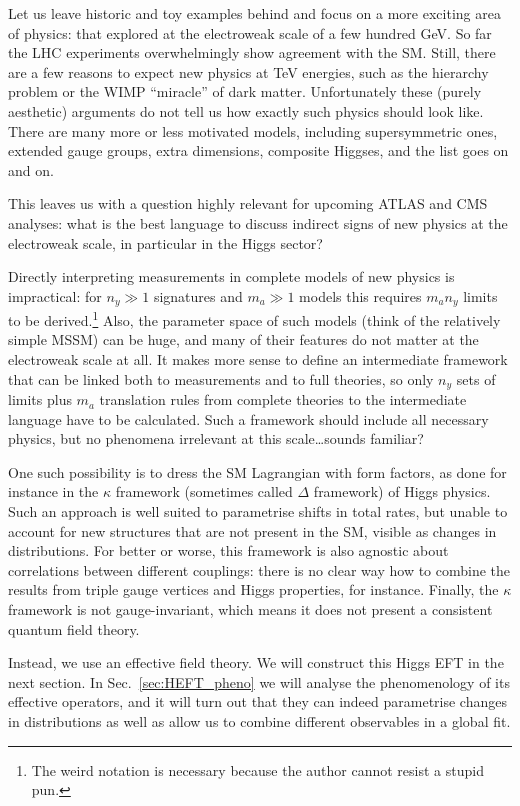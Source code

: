 Let us leave historic and toy examples behind and focus on a more
exciting area of physics: that explored at the electroweak scale of a
few hundred GeV. So far the LHC experiments overwhelmingly show
agreement with the SM. Still, there are a few reasons to expect new
physics at TeV energies, such as the hierarchy problem or the WIMP
``miracle'' of dark matter. Unfortunately these (purely aesthetic)
arguments do not tell us how exactly such physics should look
like. There are many more or less motivated models, including
supersymmetric ones, extended gauge groups, extra dimensions,
composite Higgses, and the list goes on and on.

This leaves us with a question highly relevant for upcoming ATLAS and
CMS analyses: what is the best language to discuss indirect signs of
new physics at the electroweak scale, in particular in the Higgs
sector?

Directly interpreting measurements in complete models of new physics
is impractical: for $n_y \gg 1$ signatures and $m_a \gg 1$ models this
requires $m_a n_y$ limits to be derived.\footnote{The weird notation
  is necessary because the author cannot resist a stupid pun.} Also,
the parameter space of such models (think of the relatively simple
MSSM) can be huge, and many of their features do not matter at the
electroweak scale at all. It makes more sense to define an
intermediate framework that can be linked both to measurements and to
full theories, so only $n_y$ sets of limits plus $m_a$ translation
rules from complete theories to the intermediate language have to be
calculated. Such a framework should include all necessary physics, but
no phenomena irrelevant at this scale\dots sounds familiar?

One such possibility is to dress the SM Lagrangian with form factors,
as done for instance in the $\kappa$ framework (sometimes called
$\Delta$ framework) of Higgs physics. Such an approach is well suited
to parametrise shifts in total rates, but unable to account for new
structures that are not present in the SM, visible as changes in
distributions. For better or worse, this framework is also agnostic
about correlations between different couplings: there is no clear way
how to combine the results from triple gauge vertices and Higgs
properties, for instance. Finally, the $\kappa$ framework is not
gauge-invariant, which means it does not present a consistent quantum
field theory. 

Instead, we use an effective field theory. We will construct this
Higgs EFT in the next section. In Sec.~\ref{sec:HEFT_pheno} we will
analyse the phenomenology of its effective operators, and it will turn
out that they can indeed parametrise changes in distributions as well
as allow us to combine different observables in a global fit.




